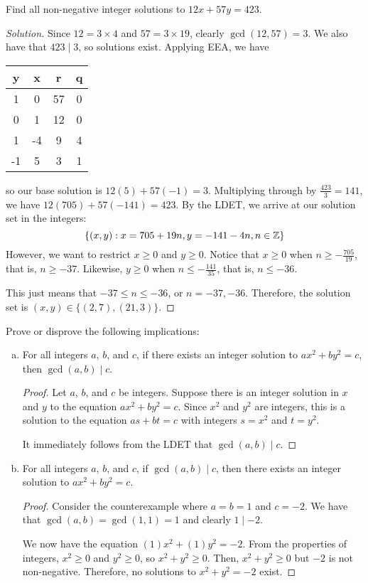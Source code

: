 \question Find all non-negative integer solutions to $12x+57y=423$.
\begin{proof}[Solution]
  Since $12 = 3\times4$ and $57=3\times19$, clearly $\gcd(12,57)=3$.
  We also have that $423 \mid 3$, so solutions exist.
  Applying EEA, we have
  \begin{center}
    \begin{tabular}{C|C|C|C}
      y  & x  & r  & q \\   & 0  & 57 & 0 \\
      0  & 1  & 12 & 0 \\
      1  & -4 & 9  & 4 \\
      -1 & 5  & 3  & 1
    \end{tabular}
  \end{center}
  so our base solution is $12(5)+57(-1)=3$.
  Multiplying through by $\frac{423}{3}=141$, we have $12(705)+57(-141)=423$.
  By the LDET, we arrive at our solution set in the integers:
  \begin{equation*}
    \{ (x,y) : x = 705 + 19n, y = -141 - 4n, n\in\mathbb{Z} \}
  \end{equation*}
  However, we want to restrict $x \geq 0$ and $y \geq 0$.
  Notice that $x \geq 0$ when $n \geq -\frac{705}{19}$, that is, $n \geq -37$.
  Likewise, $y \geq 0$ when $n \leq -\frac{141}{35}$, that is, $n \leq -36$.

  This just means that $-37 \leq n \leq -36$, or $n=-37,-36$.
  Therefore, the solution set is $(x,y)\in\{(2,7),(21,3)\}$.
\end{proof}


\question Prove or disprove the following implications:
\begin{enumerate}[(a)]
  \item For all integers $a$, $b$, and $c$, if there exists an integer solution to $ax^2+by^2=c$,
        then $\gcd(a,b) \mid c$.
        \begin{proof}
          Let $a$, $b$, and $c$ be integers.
          Suppose there is an integer solution in $x$ and $y$ to the equation $ax^2+by^2=c$.
          Since $x^2$ and $y^2$ are integers, this is a solution to the equation $as+bt=c$
          with integers $s=x^2$ and $t=y^2$.

          It immediately follows from the LDET that $\gcd(a,b) \mid c$.
        \end{proof}
  \item For all integers $a$, $b$, and $c$, if $\gcd(a,b) \mid c$,
        then there exists an integer solution to $ax^2+by^2=c$.
        \begin{proof}
          Consider the counterexample where $a=b=1$ and $c=-2$.
          We have that $\gcd(a,b)=\gcd(1,1)=1$ and clearly $1 \mid -2$.

          We now have the equation $(1)x^2+(1)y^2=-2$.
          From the properties of integers, $x^2 \geq 0$ and $y^2 \geq 0$, so $x^2+y^2 \geq 0$.
          Then, $x^2 + y^2 \geq 0$ but $-2$ is not non-negative.
          Therefore, no solutions to $x^2+y^2=-2$ exist.
        \end{proof}
\end{enumerate}


